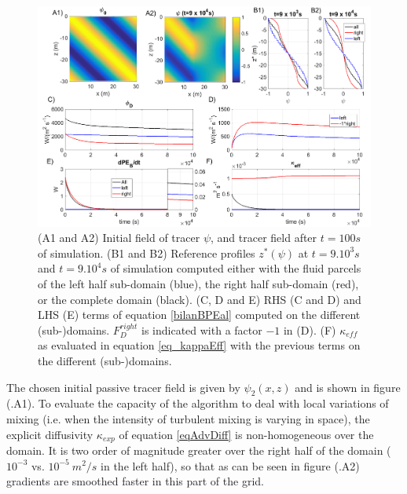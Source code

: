 \begin{figure}[h!]
\centering
\includegraphics[width=1\textwidth]{./CHAP_BPE/AGBPE_numlab2_2.png}
\caption{(A1 and A2) Initial field of tracer $\psi$, and tracer field after $t=100s$ of simulation. (B1 and B2) Reference profiles $z^*(\psi)$ at $t=9.10^3s$ and $t=9.10^4s$ of simulation computed either with the fluid parcels of the left half sub-domain (blue), the right half sub-domain (red), or the complete domain (black). (C, D and E) RHS (C and D) and LHS (E) terms of equation \ref{bilanBPEal} computed on the different (sub-)domains. $F_D^{right}$ is indicated with a factor $-1$ in (D). (F) $\kappa_{eff}$ as evaluated in equation \ref{eq_kappaEff} with the previous terms on the different (sub-)domains.}
\label{fig2numlab}
\end{figure}

The chosen initial passive tracer field is given by $\psi_2 (x,z)$ and is shown in figure (.A1).
To evaluate the capacity of the algorithm to deal with local variations of mixing (i.e. when the intensity of turbulent mixing is varying in space), the explicit diffusivity $\kappa_{exp}$ of equation \ref{eqAdvDiff} is non-homogeneous over the domain. It is two order of magnitude greater over the right half of the domain ($10^{-3}$ vs. $10^{-5} \ m^2/s$ in the left half), so that as can be seen in figure (.A2) gradients are smoothed faster in this part of the grid.

